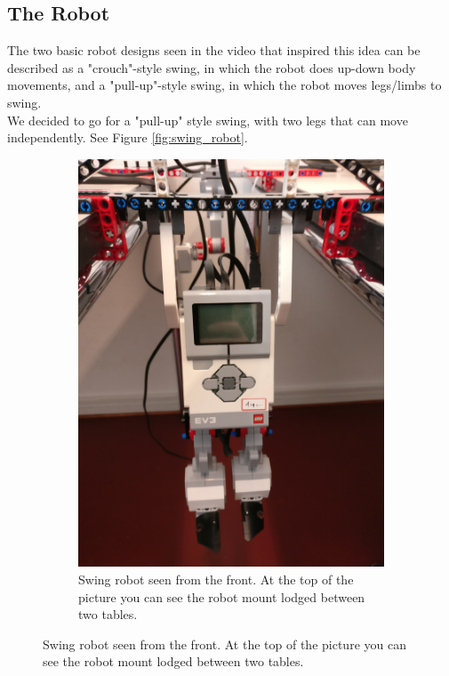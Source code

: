 \documentclass[11pt, a4paper]{article}
\begin{document}
\subsection{The Robot}
The two basic robot designs seen in the video that inspired this idea\cite{youtube_swing} can be described as a "crouch"-style swing, in which the robot does up-down body movements, and a "pull-up"-style swing, in which the robot moves legs/limbs to swing. \\
We decided to go for a "pull-up" style swing, with two legs that can move independently. See Figure \ref{fig:swing_robot}. \\
\begin{figure}[H]
	\centering
	\begin{subfigure}{.48\textwidth}
		\centering
		\includegraphics[width=1\linewidth]{images/swing_robot_front}
		\caption{Swing robot seen from the front. At the top of the picture you can see the robot mount lodged between two tables.}
		\label{fig:swing_robot_front}

\end{subfigure}
\end{figure}
\end{document}
